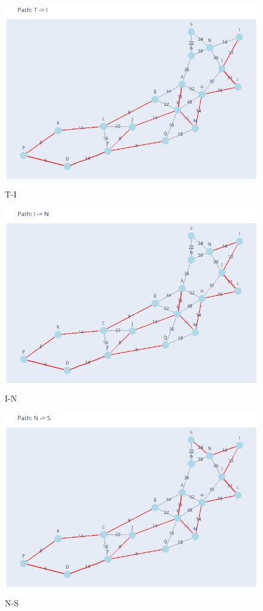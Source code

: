 \documentclass[11pt]{book}
\renewcommand{\=}[1]{\stackrel{#1}{=}} %
\theoremstyle{definition}
\theoremstyle{remark}
\begin{document}
\begin{figure}
    \centering
    \includegraphics[width=0.7\linewidth]{MSTpath/14.png}
    \caption{T-I}
    \label{fig:enter-label}
\end{figure}
\begin{figure}
    \centering
    \includegraphics[width=0.7\linewidth]{MSTpath/15.png}
    \caption{I-N}
    \label{fig:enter-label}
\end{figure}
\begin{figure}
    \centering
    \includegraphics[width=0.7\linewidth]{MSTpath/16.png}
    \caption{N-S}
    \label{fig:enter-label}
\end{figure}
\end{document}
